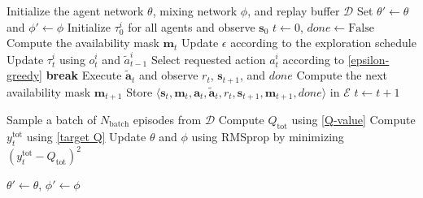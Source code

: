 \begin{algorithm}[t]
\caption{MBA-RL training procedure}
\label{alg:QMIX}

\begin{algorithmic}[1]
\STATE Initialize the agent network $\theta$, mixing network $\phi$, and replay buffer $\mathcal{D}$
\STATE Set $\theta'\leftarrow\theta$ and $\phi'\leftarrow\phi$
    \STATE Initialize $\tau_0^i$ for all agents and observe $\mathbf{s}_0$
    \STATE {}
    \STATE $t\leftarrow0$, $done\leftarrow\mathrm{False}$
        \STATE Compute the availability mask $\mathbf{m}_t$
        \STATE Update $\epsilon$ according to the exploration schedule
            \STATE Update $\tau_t^i$ using $o_t^i$ and $\tilde{a}_{t-1}^i$
            \STATE Select requested action $a_t^i$ according to \eqref{epsilon-greedy}
        \ENDFOR
        \STATE {}
            \STATE {}
            \STATE {}
            \STATE \textbf{break}
        \ENDIF
        \STATE {}
        \STATE Execute $\tilde{\mathbf{a}}_t$ and observe $r_t$, $\mathbf{s}_{t+1}$, and $done$
        \STATE Compute the next availability mask $\mathbf{m}_{t+1}$
        \STATE Store $\langle
        \mathbf{s}_t,\mathbf{m}_t,\mathbf{a}_t,
        \tilde{\mathbf{a}}_t,r_t,
        \mathbf{s}_{t+1},\mathbf{m}_{t+1},done
        \rangle$ in $\mathcal{E}$
        \STATE $t\leftarrow t+1$
    \ENDWHILE

        \STATE {}
    \ENDIF

        \STATE Sample a batch of $N_{\mathrm{batch}}$ episodes from $\mathcal{D}$
        \STATE Compute $Q_{\mathrm{tot}}$ using \eqref{Q-value}
        \STATE Compute $y_t^{\mathrm{tot}}$ using \eqref{target Q}
        \STATE Update $\theta$ and $\phi$ using RMSprop \cite{zou2019sufficient} by minimizing
        $\left(y_t^{\mathrm{tot}}-Q_{\mathrm{tot}}\right)^2$
    \ENDIF

        \STATE $\theta'\leftarrow\theta$, $\phi'\leftarrow\phi$
    \ENDIF
\ENDFOR
\end{algorithmic}
\end{algorithm}
